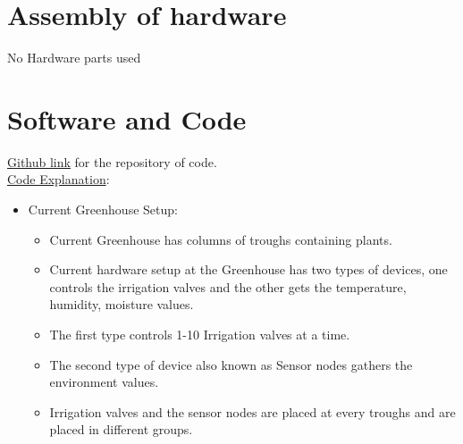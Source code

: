 \documentclass[a4paper,12pt,oneside]{book}
\begin{document}
\begin{enumerate}
\section{Assembly of hardware}
\hspace{7mm}No Hardware parts used



\section{Software and Code}
\hspace{7mm}\href{https://github.com/eYSIP-2016/eYSIP-2016-Web-Monitoring-For-Greenhouse}{Github link} for the repository of code.\\

{\underline{Code Explanation}}:\\
\begin{itemize}
    \setlength\itemsep{0.2cm}
    \item{Current Greenhouse Setup:}
        \begin{itemize}
            \item{Current Greenhouse has columns of troughs containing plants.}
            \item{Current hardware setup at the Greenhouse has two types of devices, one controls the irrigation valves and the other gets the temperature, humidity, moisture values.}
            \item{The first type controls 1-10 Irrigation valves at a time.}
            \item{The second type of device also known as Sensor nodes gathers the environment values.}
            \item{Irrigation valves and the sensor nodes are placed at every troughs and are placed in different groups.}
        \end{itemize}
        

\end{itemize}
\end{enumerate}
\end{document}
